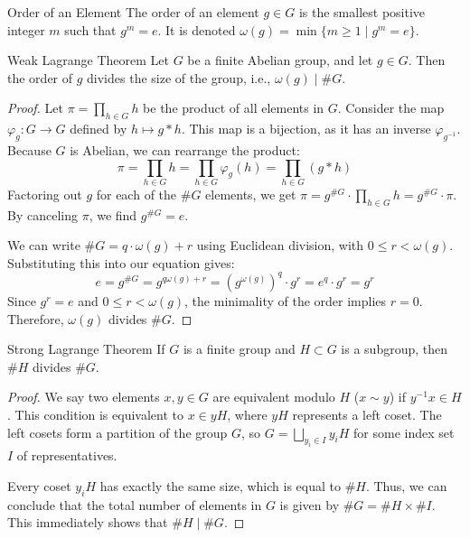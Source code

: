 \documentclass[11pt, a4paper]{article}
\begin{document}
\begin{definition}{Order of an Element}{}
The order of an element $g \in G$ is the smallest positive integer $m$ such that $g^m = e$. It is denoted $\omega(g) = \min \{ m \ge 1 \mid g^m = e \}$.
\end{definition}

\begin{theorem}{Weak Lagrange Theorem}{}
Let $G$ be a finite Abelian group, and let $g \in G$. Then the order of $g$ divides the size of the group, i.e., $\omega(g) \mid \#G$.
\end{theorem}
\begin{proof}
Let $\pi = \prod_{h \in G} h$ be the product of all elements in $G$. Consider the map $\varphi_g : G \to G$ defined by $h \mapsto g * h$. This map is a bijection, as it has an inverse $\varphi_{g^{-1}}$. Because $G$ is Abelian, we can rearrange the product:
$$ \pi = \prod_{h \in G} h = \prod_{h \in G} \varphi_g(h) = \prod_{h \in G} (g * h) $$
Factoring out $g$ for each of the $\#G$ elements, we get $\pi = g^{\#G} \cdot \prod_{h \in G} h = g^{\#G} \cdot \pi$. By canceling $\pi$, we find $g^{\#G} = e$.

We can write $\#G = q \cdot \omega(g) + r$ using Euclidean division, with $0 \le r < \omega(g)$. Substituting this into our equation gives:
$$ e = g^{\#G} = g^{q \omega(g) + r} = (g^{\omega(g)})^q \cdot g^r = e^q \cdot g^r = g^r $$
Since $g^r = e$ and $0 \le r < \omega(g)$, the minimality of the order implies $r = 0$. Therefore, $\omega(g)$ divides $\#G$.
\end{proof}

\begin{theorem}{Strong Lagrange Theorem}{}
If $G$ is a finite group and $H \subset G$ is a subgroup, then $\#H$ divides $\#G$.
\end{theorem}
\begin{proof}
We say two elements $x, y \in G$ are equivalent modulo $H$ ($x \sim y$) if $y^{-1}x \in H$. This condition is equivalent to $x \in yH$, where $yH$ represents a left coset. The left cosets form a partition of the group $G$, so $G = \bigsqcup_{y_i \in I} y_iH$ for some index set $I$ of representatives.

Every coset $y_iH$ has exactly the same size, which is equal to $\#H$. Thus, we can conclude that the total number of elements in $G$ is given by $\#G = \#H \times \#I$. This immediately shows that $\#H \mid \#G$.
\end{proof}
\end{document}
